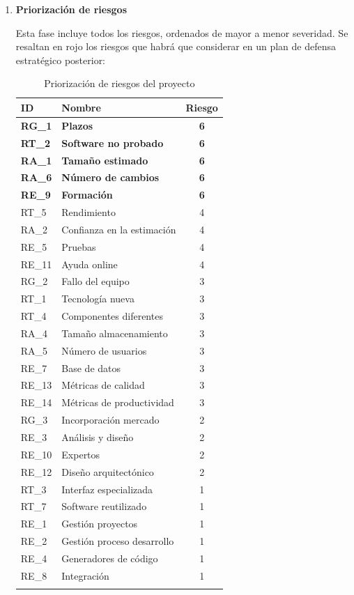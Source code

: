 \begin{enumerate}
\begin{itemize}
\endgroup

\end{itemize}

\item \textbf{Priorización de riesgos} \par
Esta fase incluye todos los riesgos, ordenados de mayor a menor severidad. Se resaltan en rojo los riesgos que habrá que considerar en un plan de defensa estratégico posterior:


\begingroup
\renewcommand\arraystretch{1.3}

\begin{longtable}{l p{5cm} c}
\hline
\textbf{ID} & \textbf{Nombre} & \textbf{Riesgo} \\
\hline
\endhead
\endfoot
\textbf{RG\_1} & 
\textbf{Plazos} &
\textbf{6} 
 \\
\textbf{RT\_2} & 
\textbf{Software no probado} &
\textbf{6} 
 \\
\textbf{RA\_1} & 
\textbf{Tamaño estimado} &
\textbf{6} 
 \\
\textbf{RA\_6} & 
\textbf{Número de cambios} &
\textbf{6} 
 \\
\textbf{RE\_9} & 
\textbf{Formación} &
\textbf{6} 
 \\
 
RT\_5 & 
Rendimiento &
4 
 \\
RA\_2 & 
Confianza en la estimación &
4 
 \\
RE\_5 & 
Pruebas &
4 
 \\
RE\_11 & 
Ayuda online &
4 
 \\
RG\_2 & 
Fallo del equipo &
3 
 \\
RT\_1 & 
Tecnología nueva &
3 
 \\
RT\_4 & 
Componentes diferentes &
3 
 \\
RA\_4 & 
Tamaño almacenamiento &
3 
 \\
RA\_5 & 
Número de usuarios &
3 
 \\
RE\_7 & 
Base de datos &
3 
 \\
RE\_13 & 
Métricas de calidad &
3 
 \\
RE\_14 & 
Métricas de productividad &
3 
 \\
RG\_3 & 
Incorporación mercado &
2 
 \\
RE\_3 & 
Análisis y diseño &
2 
 \\
RE\_10 & 
Expertos &
2 
 \\
RE\_12 & 
Diseño arquitectónico &
2 
 \\
RT\_3 & 
Interfaz especializada &
1 
 \\
RT\_7 & 
Software reutilizado &
1 
 \\
RE\_1 & 
Gestión proyectos &
1 
 \\
RE\_2 & 
Gestión proceso desarrollo &
1 
 \\
RE\_4 & 
Generadores de código &
1 
 \\
RE\_8 & 
Integración &
1 
 \\
\hline
\caption{Priorización de riesgos del proyecto}\label{prioriz_riesg}\\
\end{longtable}


\end{enumerate}
